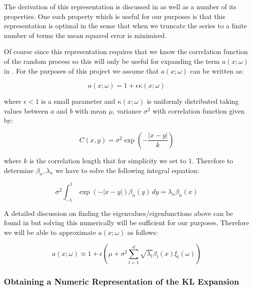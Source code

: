 The derivation of this representation is discussed in \cite{stochastic-fem} as
well as a number of its properties. One such property which is useful for our
purposes is that this representation is optimal in the sense that when we
truncate the series to a finite number of terms the mean squared error is
minimised.

Of course since this representation requires that we know the correlation
function of the random process so this will only be useful for expanding the
term $a(x;\omega)$ in .  For the purposes of this
project we assume that $a(x;\omega)$ can be written as:

\begin{equation}
    a(x;\omega) = 1 + \epsilon\kappa(x;\omega)
\end{equation}

where $\epsilon < 1$ is a small parameter and  $\kappa(x;\omega)$ is
uniformly distributed taking values between $a$ and $b$ with mean $\mu$,
variance $\sigma^2$ with correlation function given by:

\begin{equation}
    C(x, y) = \sigma^2\exp\left(-\frac{|x - y|}{k}\right)
\end{equation}

where $k$ is the correlation length that for simplicity we set to $1$.
Therefore to determine $\beta_n, \lambda_n$ we have to solve the following
integral equation:

\begin{equation}\label{eq:oned-stochastic-kle-eigenvalue-problem}
    \sigma^2\int_{-1}^1\exp(-|x - y|)\beta_n(y)\, dy = \lambda_n\beta_n(x)
\end{equation}

A detailed discussion on finding the eigenvalues/eigenfunctions above can be
found in \cite{stochastic-fem} but solving this numerically will be sufficient
for our purposes. Therefore we will be able to approximate $a(x;\omega)$
as follows:

\begin{equation}\label{eq:oned-stochastic-kl-kappa}
    a(x;\omega) \approx 1 + \epsilon\left(
        \mu + \sigma^2\sum_{l=1}^d\sqrt{\lambda_l}\beta_l(x)\xi_l(\omega)
    \right)
\end{equation}

\subsubsection{Obtaining a Numeric Representation of the KL Expansion}

